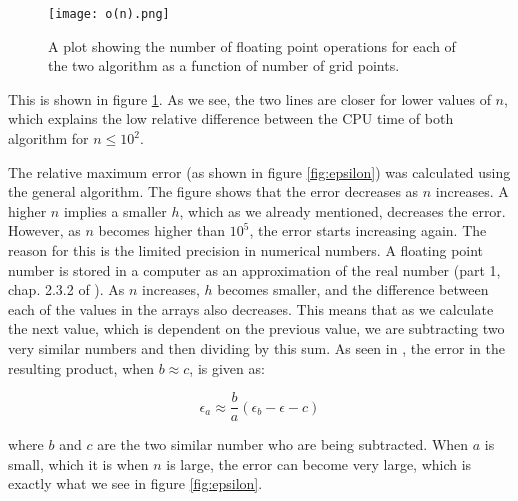 \documentclass[a4paper,10pt,English]{article}
\begin{document}
\begin{figure}
    \centering
    \texttt{[image: o(n).png]}
    \caption{A plot showing the number of floating point operations for each of the two algorithm as a function of number of grid points.}
    \label{fig:complexity}
\end{figure}

This is shown in figure \ref{fig:complexity}. As we see, the two lines are closer for lower values of $n$, which explains the low relative difference between the CPU time of both algorithm for $n \leq 10^2$.

\newline

The relative maximum error (as shown in figure \ref{fig:epsilon}) was calculated using the general algorithm. The figure shows that the error decreases as $n$ increases. A higher $n$ implies a smaller $h$, which as we already mentioned, decreases the error. However, as $n$ becomes higher than $10^5$, the error starts increasing again. The reason for this is the limited precision in numerical numbers. A floating point number is stored in a computer as an approximation of the real number (part 1, chap. 2.3.2 of \cite{Hjorth-Jensen2015}). As $n$ increases, $h$ becomes smaller, and the difference between each of the values in the arrays also decreases. This means that as we calculate the next value, which is dependent on the previous value, we are subtracting two very similar numbers and then dividing by this sum. As seen in \cite{Hjorth-Jensen2015}, the error in the resulting product, when $b \approx c$, is given as:

$$\epsilon_a \approx \frac{b}{a} (\epsilon_b - \epsilon-c)$$

where $b$ and $c$ are the two similar number who are being subtracted. When $a$ is small, which it is when $n$ is large, the error can become very large, which is exactly what we see in figure \ref{fig:epsilon}.

\newline
\end{document}
